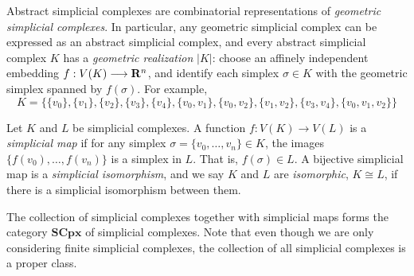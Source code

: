\begin{remark}
    Abstract simplicial complexes are combinatorial representations of \emph{geometric simplicial complexes}. In particular,
    any geometric simplicial complex can be expressed as an abstract simplicial complex, and every abstract simplicial complex
    $K$ has a \emph{geometric realization} $|K|$\autocite{wiki:asc}: choose an affinely independent embedding $f : V(K) \longrightarrow \mathbf{R}^n$,
    and identify each simplex $\sigma \in K$ with the geometric simplex spanned by $f(\sigma)$. For example,
    \[
        K = \{\{v_0\},\{v_1\},\{v_2\},\{v_3\},\{v_4\},\{v_0,v_1\},\{v_0,v_2\},\{v_1,v_2\},\{v_3,v_4\},\{v_0,v_1,v_2\}\}
    \]
    \begin{center}
    \end{center}
\end{remark}

\begin{definition}
    Let $K$ and $L$ be simplicial complexes. A function $f : V(K) \longrightarrow V(L)$ is a \emph{simplicial map}
    if for any simplex $\sigma = \{v_0, \dots, v_n\} \in K$, the images $\{f(v_0), \dots, f(v_n)\}$ is a simplex in $L$. That
    is, $f(\sigma) \in L$. A bijective simplicial map is a \emph{simplicial isomorphism}, and we say $K$ and $L$ are
    \emph{isomorphic}, $K \cong L$, if there is a simplicial isomorphism between them.
\end{definition}

\begin{remark}
    The collection of simplicial complexes together with simplicial maps forms the category $\mathbf{SCpx}$ of simplicial complexes.
    Note that even though we are only considering finite simplicial complexes, the collection of all simplicial complexes is a proper
    class.
\end{remark}

